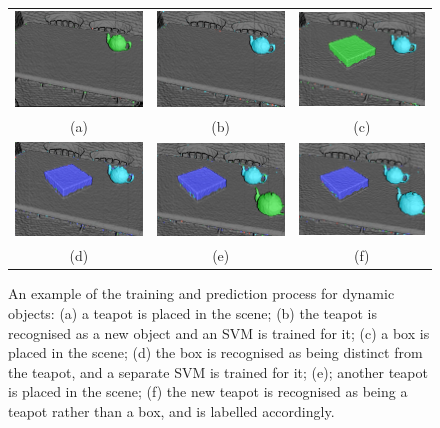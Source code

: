 \begin{figure}[ht]
  \label{fig:moseg_recognition}
  \centering
  \begin{tabular}{ccc}
    \includegraphics[width=.28\linewidth]{figures/moseg/objects1.png} &
    \includegraphics[width=.28\linewidth]{figures/moseg/objects2.png} &
    \includegraphics[width=.28\linewidth]{figures/moseg/objects3.png} \\ 
    (a) & (b) & (c) \\
    \includegraphics[width=.28\linewidth]{figures/moseg/objects4.png} &
    \includegraphics[width=.28\linewidth]{figures/moseg/objects5.png} &
    \includegraphics[width=.28\linewidth]{figures/moseg/objects6.png} \\ 
    (d) & (e) & (f) \\
  \end{tabular}
  \caption{An example of the training and prediction process for dynamic
    objects:
    (a) a teapot is placed in the scene;
    (b) the teapot is recognised as a new object and an SVM is trained for it;
    (c) a box is placed in the scene; (d) the box is recognised as being
    distinct from the teapot, and a separate SVM is trained for it;
    (e); another teapot is placed in the scene; (f) the new teapot is recognised
    as being a teapot rather than a box, and is labelled accordingly.}
\end{figure}